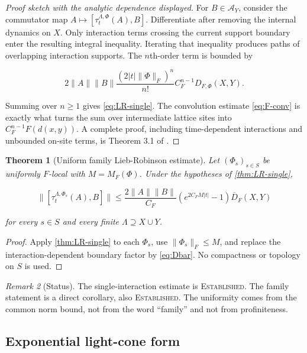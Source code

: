 \documentclass[12pt]{article}
\newtheorem{theorem}{Theorem}[section]
\theoremstyle{definition}
\theoremstyle{remark}
\newtheorem{remark}[theorem]{Remark}
\newcommand{\Alg}{\mathcal A}
\newcommand{\EST}{\textsc{Established}}
\begin{document}
\begin{proof}[Proof sketch with the analytic dependence displayed]
For $B\in\Alg_Y$, consider the commutator map
$A\mapsto[\tau_t^{\Lambda,\Phi}(A),B]$.  Differentiate after removing the
internal dynamics on $X$.  Only interaction terms crossing the current
support boundary enter the resulting integral inequality.  Iterating that
inequality produces paths of overlapping interaction supports.  The
$n$th-order term is bounded by

\begin{equation}
  2\|A\|\|B\|
  \frac{(2|t|\|\Phi\|_F)^n}{n!}
  C_F^{n-1}D_{F,\Phi}(X,Y).
\end{equation}

Summing over $n\ge1$ gives \cref{eq:LR-single}.  The convolution estimate
\cref{eq:F-conv} is exactly what turns the sum over intermediate lattice
sites into $C_F^{n-1}F(d(x,y))$.  A complete proof, including time-dependent
interactions and unbounded on-site terms, is Theorem 3.1 of
\cite{NSY2019}.
\end{proof}

\begin{theorem}[Uniform family Lieb-Robinson estimate]
\label{thm:family-LR}
Let $(\Phi_s)_{s\in S}$ be uniformly $F$-local with
$M=M_F(\Phi)$.  Under the hypotheses of \cref{thm:LR-single},

\begin{equation}
 \|[\tau_t^{\Lambda,\Phi_s}(A),B]\|
 \le
 \frac{2\|A\|\|B\|}{C_F}
 \left(e^{2C_FM|t|}-1\right)
 \overline D_F(X,Y)
 \label{eq:uniform-LR}
\end{equation}

for every $s\in S$ and every finite $\Lambda\supseteq X\cup Y$.
\end{theorem}

\begin{proof}
Apply \cref{thm:LR-single} to each $\Phi_s$, use
$\|\Phi_s\|_F\le M$, and replace the interaction-dependent boundary factor
by \cref{eq:Dbar}.  No compactness or topology on $S$ is used.
\end{proof}

\begin{remark}[Status]
The single-interaction estimate is \EST{}.  The family statement is a direct
corollary, also \EST{}.  The uniformity comes from the common norm bound, not
from the word ``family'' and not from profiniteness.
\end{remark}

\subsection{Exponential light-cone form}
\end{document}
